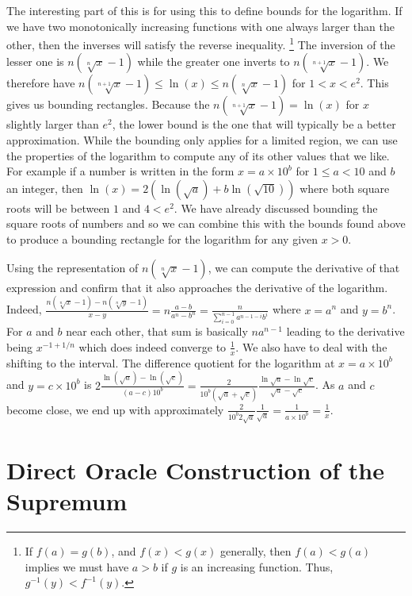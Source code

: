 \documentclass[12pt]{article}
\theoremstyle{remark}
\begin{document}
The interesting part of this is for using this to define bounds for the logarithm. If we have two monotonically increasing functions with one always larger than the other, then the inverses will satisfy the reverse inequality. \footnote{If $f(a)=g(b)$, and $f(x) < g(x)$ generally, then $f(a) < g(a)$ implies we must have $a > b$ if $g$ is an increasing function. Thus, $g^{-1} (y) < f^{-1} (y)$.}  The inversion of the lesser one is $n(\sqrt[n]{ x }- 1)$ while the greater one inverts to $n(\sqrt[n+1]{x} - 1)$. We therefore have $n(\sqrt[n+1]{x} - 1) \leq \ln(x) \leq n (\sqrt[n]{x}-1)$ for $1 < x < e^2$. This gives us bounding rectangles. Because the $n (\sqrt[n+1]{x} - 1) = \ln(x)$ for $x$ slightly larger than $e^2$, the lower bound is the one that will typically be a better approximation.  While the bounding only applies for a limited region, we can use the properties of the logarithm to compute any of its other values that we like. For example if a number is written in the form $x=a\times 10^b$ for $1 \leq a < 10$ and $b$ an integer, then $\ln(x) = 2 ( \ln( \sqrt{a} ) + b \ln(\sqrt{10}) )$ where both square roots will be between $1$ and $4< e^2$. We have already discussed bounding the square roots of numbers and so we can combine this with the bounds found above to produce a bounding rectangle for the logarithm for any given $x>0$. 

Using the representation of $ n (\sqrt[n]{x}-1)$, we can compute the derivative of that expression and confirm that it also approaches the derivative of the logarithm. Indeed, $\frac{ n (\sqrt[n]{x}-1) -  n (\sqrt[n]{y}-1)}{x-y} = n \frac{a-b}{a^n -b^n} = \frac{n}{\sum_{i=0}^{n-1} a^{n-1-i} b^i}$ where $x = a^n$ and $y = b^n$.  For $a$ and $b$ near each other, that sum is basically $n a^{n-1}$ leading to the derivative being $x^{-1+1/n}$ which does indeed converge to $\frac{1}{x}$. We also have to deal with the shifting to the interval. The difference quotient for the logarithm at $x = a\times 10^b$ and $y = c \times 10^b$ is $2 \frac{\ln(\sqrt{a}) - \ln(\sqrt{c})}{(a-c)10^b} = \frac{2}{10^b(\sqrt{a}+\sqrt{c})} \frac{\ln \sqrt{a} - \ln \sqrt{c} }{\sqrt{a}- \sqrt{c}} $. As $a$ and $c$ become close, we end up with approximately $\frac{2}{10^b 2 \sqrt{a}} \frac{1}{\sqrt{a}} = \frac{1}{a\times 10^b} = \frac{1}{x}$.

\section{Direct Oracle Construction of the Supremum}\label{app:sup}
\end{document}
